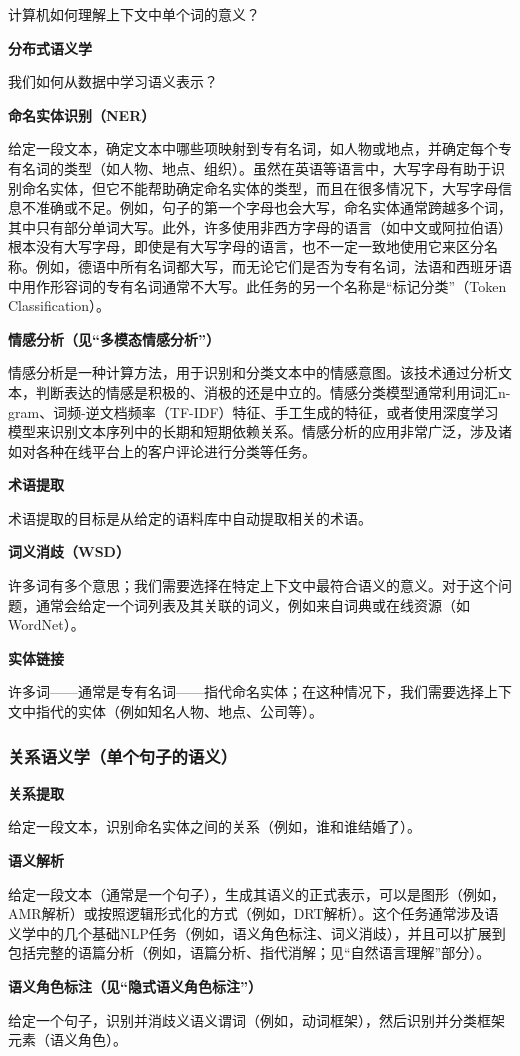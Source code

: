 计算机如何理解上下文中单个词的意义？

\textbf{分布式语义学}  

我们如何从数据中学习语义表示？

\textbf{命名实体识别（NER）} 

给定一段文本，确定文本中哪些项映射到专有名词，如人物或地点，并确定每个专有名词的类型（如人物、地点、组织）。虽然在英语等语言中，大写字母有助于识别命名实体，但它不能帮助确定命名实体的类型，而且在很多情况下，大写字母信息不准确或不足。例如，句子的第一个字母也会大写，命名实体通常跨越多个词，其中只有部分单词大写。此外，许多使用非西方字母的语言（如中文或阿拉伯语）根本没有大写字母，即使是有大写字母的语言，也不一定一致地使用它来区分名称。例如，德语中所有名词都大写，而无论它们是否为专有名词，法语和西班牙语中用作形容词的专有名词通常不大写。此任务的另一个名称是“标记分类”（Token Classification）。

\textbf{情感分析（见“多模态情感分析”）}  

情感分析是一种计算方法，用于识别和分类文本中的情感意图。该技术通过分析文本，判断表达的情感是积极的、消极的还是中立的。情感分类模型通常利用词汇n-gram、词频-逆文档频率（TF-IDF）特征、手工生成的特征，或者使用深度学习模型来识别文本序列中的长期和短期依赖关系。情感分析的应用非常广泛，涉及诸如对各种在线平台上的客户评论进行分类等任务。

\textbf{术语提取}  

术语提取的目标是从给定的语料库中自动提取相关的术语。

\textbf{词义消歧（WSD）}  

许多词有多个意思；我们需要选择在特定上下文中最符合语义的意义。对于这个问题，通常会给定一个词列表及其关联的词义，例如来自词典或在线资源（如WordNet）。

\textbf{实体链接}  

许多词——通常是专有名词——指代命名实体；在这种情况下，我们需要选择上下文中指代的实体（例如知名人物、地点、公司等）。
\subsubsection{关系语义学（单个句子的语义）}
\textbf{关系提取}  

给定一段文本，识别命名实体之间的关系（例如，谁和谁结婚了）。

\textbf{语义解析}  

给定一段文本（通常是一个句子），生成其语义的正式表示，可以是图形（例如，AMR解析）或按照逻辑形式化的方式（例如，DRT解析）。这个任务通常涉及语义学中的几个基础NLP任务（例如，语义角色标注、词义消歧），并且可以扩展到包括完整的语篇分析（例如，语篇分析、指代消解；见“自然语言理解”部分）。

\textbf{语义角色标注（见“隐式语义角色标注”）}  

给定一个句子，识别并消歧义语义谓词（例如，动词框架），然后识别并分类框架元素（语义角色）。